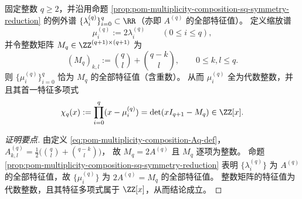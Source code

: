 \begin{conclusion}\label{con:xi-terminal-replica-softcore-exceptional-spectrum-double-integer-matrix}
固定整数 \(q\ge 2\)，并沿用命题 \ref{prop:pom-multiplicity-composition-sq-symmetry-reduction} 的例外谱 \(\{\lambda_i^{(q)}\}_{i=0}^{q}\subset\RR\)（亦即 \(A^{(q)}\) 的全部特征值）。
定义缩放谱
\[
\mu_i^{(q)}:=2\lambda_i^{(q)}\qquad(0\le i\le q),
\]
并令整数矩阵 \(M_q\in\ZZ^{(q+1)\times(q+1)}\) 为
\[
\boxed{\;
(M_q)_{k,l}:=\binom{q}{l}+\binom{q-k}{l},
\qquad 0\le k,l\le q.\;}
\]
则 \(\{\mu_i^{(q)}\}_{i=0}^{q}\) 恰为 \(M_q\) 的全部特征值（含重数）。
从而 \(\mu_i^{(q)}\) 全为代数整数，并且其首一特征多项式
\[
\chi_q(x):=\prod_{i=0}^{q}(x-\mu_i^{(q)})=\det(xI_{q+1}-M_q)\in\ZZ[x].
\]
\end{conclusion}
\begin{proof}[证明要点]
由定义 \eqref{eq:pom-multiplicity-composition-Aq-def}，
\(
A^{(q)}_{k,l}=\frac12\bigl(\binom{q}{l}+\binom{q-k}{l}\bigr)
\)，
故 \(M_q=2A^{(q)}\) 且 \(M_q\) 逐项为整数。
命题 \ref{prop:pom-multiplicity-composition-sq-symmetry-reduction} 表明 \(\{\lambda_i^{(q)}\}\) 为 \(A^{(q)}\) 的全部特征值，故 \(\{\mu_i^{(q)}\}\) 为 \(2A^{(q)}=M_q\) 的全部特征值。
整数矩阵的特征值为代数整数，且其特征多项式属于 \(\ZZ[x]\)，从而结论成立。
\end{proof}



